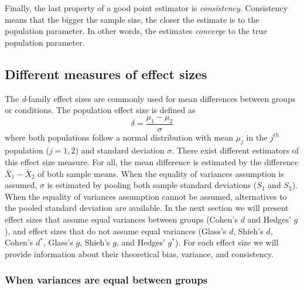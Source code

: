 \documentclass[
  12pt,
  french,
]{article}
\begin{document}
Finally, the last property of a good point estimator is
\emph{consistency}. Consistency means that the bigger the sample size,
the closer the estimate is to the population parameter. In other words,
the estimates \emph{converge} to the true population parameter.

\hypertarget{different-measures-of-effect-sizes}{%
\subsection{Different measures of effect
sizes}\label{different-measures-of-effect-sizes}}

The \emph{d}-family effect sizes are commonly used for mean differences
between groups or conditions. The population effect size is defined as
\begin{equation} 
\delta = \frac{\mu_{1}-\mu_{2}}{\sigma} 
\label{eqn:Cohendelta}
\end{equation} where both populations follow a normal distribution with
mean \(\mu_j\) in the \(j^{th}\) population (\(j=1,2\)) and standard
deviation \(\sigma\). There exist different estimators of this effect
size measure. For all, the mean difference is estimated by the
difference \(\bar{X}_1-\bar{X}_2\) of both sample means. When the
equality of variances assumption is assumed, \(\sigma\) is estimated by
pooling both sample standard deviations (\(S_1\) and \(S_2\)). When the
equality of variances assumption cannot be assumed, alternatives to the
pooled standard deviation are available. In the next section we will
present effect sizes that assume equal variances between groups (Cohen's
\(d\) and Hedges' \(g\)), and effect sizes that do not assume equal
variances (Glass's \(d\), Shieh's \(d\), Cohen's \(d^*\), Glass's \(g\),
Shieh's \(g\), and Hedges' \(g^*\)). For each effect size we will
provide information about their theoretical bias, variance, and
consistency.

\hypertarget{when-variances-are-equal-between-groups}{%
\subsubsection{When variances are equal between
groups}\label{when-variances-are-equal-between-groups}}
\end{document}
